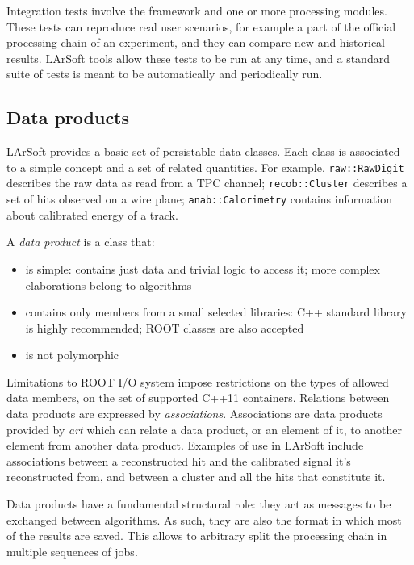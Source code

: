 Integration tests involve the framework and one or more processing
modules. These tests can reproduce real user scenarios, for example a
part of the official processing chain of an experiment, and they can
compare new and historical results. LArSoft tools allow these tests to
be run at any time, and a standard suite of tests is meant to be
automatically and periodically run.



\subsection{Data products}
\label{ssec:Development:DataProducts}

LArSoft provides a basic set of persistable data classes.
Each class is associated to a simple concept and a set of related quantities.
For example, \texttt{raw::RawDigit} describes the raw data as read from a TPC channel;
\texttt{recob::Cluster} describes a set of hits observed on a wire plane;
\texttt{anab::Calorimetry} contains information about calibrated energy of a track.

A \emph{data product} is a class that:
\begin{itemize}
   \item is simple: contains just data and trivial logic to access it;
      more complex elaborations belong to algorithms
   \item contains only members from a small selected libraries:
      C++ standard library is highly recommended; ROOT classes are also accepted
   \item is not polymorphic
\end{itemize}

Limitations to ROOT I/O system impose restrictions on the types of allowed data members,
\eg on the set of supported C++11 containers.
Relations between data products are expressed by \emph{associations}.
Associations are data products provided by \emph{art}
which can relate a data product, or an element of it,
to another element from another data product.
Examples of use in LArSoft include associations between a
reconstructed hit and the calibrated signal it's reconstructed from, and
between a cluster and all the hits that constitute it.

Data products have a fundamental structural role:
they act as messages to be exchanged between algorithms.
As such, they are also the format in which most of the results are saved.
This allows to arbitrary split the processing chain in multiple sequences of jobs.


